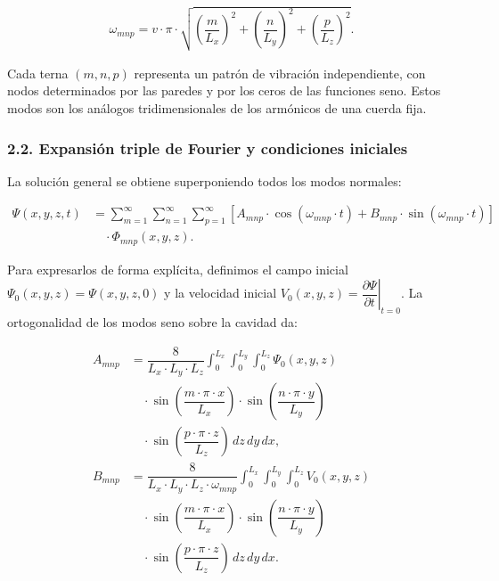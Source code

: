 \documentclass[
  spanish,
]{article}
\begin{document}
\[
\begin{aligned}
\omega_{mnp}
= v \cdot \pi \cdot \sqrt{
\left(\dfrac{m}{L_x}\right)^2
+ \left(\dfrac{n}{L_y}\right)^2
+ \left(\dfrac{p}{L_z}\right)^2}.
\end{aligned}
\]

Cada terna \((m,n,p)\) representa un patrón de vibración independiente,
con nodos determinados por las paredes y por los ceros de las funciones
seno. Estos modos son los análogos tridimensionales de los armónicos de
una cuerda fija.

\subsubsection{2.2. Expansión triple de Fourier y condiciones
iniciales}\label{expansiuxf3n-triple-de-fourier-y-condiciones-iniciales}

La solución general se obtiene superponiendo todos los modos normales:

\[
\begin{aligned}
\Psi(x,y,z,t)
&= \sum_{m=1}^{\infty} \sum_{n=1}^{\infty} \sum_{p=1}^{\infty}
\left[A_{mnp} \cdot \cos(\omega_{mnp} \cdot t)
+ B_{mnp} \cdot \sin(\omega_{mnp} \cdot t)\right] \\
&\quad \cdot \Phi_{mnp}(x,y,z).
\end{aligned}
\]

Para expresarlos de forma explícita, definimos el campo inicial
\(\Psi_0(x,y,z)=\Psi(x,y,z,0)\) y la velocidad inicial
\(V_0(x,y,z)=\left.\dfrac{\partial\Psi}{\partial t}\right|_{t=0}\). La
ortogonalidad de los modos seno sobre la cavidad da:

\[
\begin{aligned}
A_{mnp} &= \dfrac{8}{L_x \cdot L_y \cdot L_z}
\int_0^{L_x}\int_0^{L_y}\int_0^{L_z}
\Psi_0(x,y,z) \\
&\quad \cdot \sin\left(\dfrac{m \cdot \pi \cdot x}{L_x}\right)
\cdot \sin\left(\dfrac{n \cdot \pi \cdot y}{L_y}\right) \\
&\quad \cdot
\sin\left(\dfrac{p \cdot \pi \cdot z}{L_z}\right)
\, dz\, dy\, dx,
\\
B_{mnp} &= \dfrac{8}{L_x \cdot L_y \cdot L_z \cdot \omega_{mnp}}
\int_0^{L_x}\int_0^{L_y}\int_0^{L_z}
V_0(x,y,z) \\
&\quad \cdot \sin\left(\dfrac{m \cdot \pi \cdot x}{L_x}\right)
\cdot \sin\left(\dfrac{n \cdot \pi \cdot y}{L_y}\right) \\
&\quad \cdot
\sin\left(\dfrac{p \cdot \pi \cdot z}{L_z}\right)
\, dz\, dy\, dx.
\end{aligned}
\]
\end{document}
